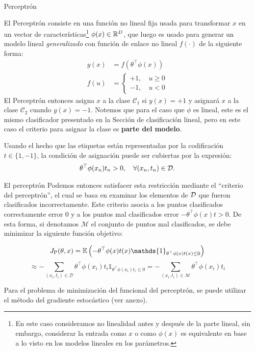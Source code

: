 \documentclass[9pt]{beamer}
\begin{document}
\begin{frame}{Perceptrón}

El Perceptrón consiste en una función no lineal fija usada para transformar $x$ en un vector de características\footnote{En este caso consideramos no linealidad antes y después de la parte lineal, sin embargo, considerar la entrada como $x$ o  como $\phi(x)$ es  equivalente en base a lo  visto en los modelos lineales en los parámetros. } $\phi(x)\in\mathbb{R}^D$, que luego es usado para generar un modelo lineal \emph{generalizado} con función de enlace no lineal $f(\cdot)$ de la siguiente forma:
\begin{align*}
  y(x) &= f(\theta^\top\phi(x))\\
  f(u) &= \left\{\begin{matrix}
  +1,\quad u\geq 0\\
  -1,\quad u<0
  \end{matrix}\right.
\end{align*} \pause
El Perceptrón entonces asigna $x$ a la clase $\mathcal{C}_1$ si $y(x)=+1$ y asignará $x$ a la clase $\mathcal{C}_2$ cuando $y(x)=-1$. Notemos que  para  el caso que $\phi$ es lineal, este es el mismo clasificador presentado en la Sección de clasificación lineal, pero en este caso el criterio para asignar la clase es \textbf{parte del modelo}. \pause

Usando el hecho que las etiquetas están representadas por la  codificación $t\in\{1,-1\}$, la condición de asignación puede ser cubiertas por la expresión:
\begin{equation*}
  \theta^\top\phi(x_n)t_n > 0,\quad \forall (x_n,t_n) \in {\mathcal D}.
\end{equation*}

\end{frame}

\begin{frame}{El perceptrón}
Podemos entonces satisfacer esta restricción mediante el ``criterio del perceptrón'', el cual se basa en examinar  los elementos de ${\mathcal D}$ que fueron clasificados incorrectamente. Este criterio asocia a los puntos clasificados correctamente error 0 y a los puntos mal clasificados error $-\theta^\top\phi(x)t>0$. De esta forma, si denotamos $\mathcal{M}$ el conjunto de puntos mal clasificados, se debe minimizar la siguiente función objetivo: \pause 

\begin{equation*}
  J_\text{P}(\theta,x) = \E\left(-\theta^\top\phi(x)t(x)\mathds{1}_{\theta^\top\phi(x)t(x)\leq 0} \right) 
\end{equation*} \pause
\begin{equation*}
\approx -\sum_{(x_i,t_i)\in \mathcal{D}}\theta^\top\phi(x_i)t_i \mathds{1}_{\theta^\top\phi(x_i)t_i\leq 0} = -\sum_{(x_i,t_i)\in \mathcal{M}}\theta^\top\phi(x_i)t_i
\end{equation*} 

Para el problema de minimización del funcional del perceptrón, se puede utilizar el método del gradiente estocástico (ver anexo). 

\end{frame}
\end{document}
